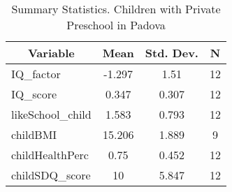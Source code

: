 
\begin{table}[htbp]\centering \caption{Summary Statistics. Children with Private Preschool in Padova \label{bothChildmaternaPrivPadova}}
\begin{tabular}{l c c  c}\hline\hline
\multicolumn{1}{c}{\textbf{Variable}} & \textbf{Mean}
 & \textbf{Std. Dev.} & \textbf{N}\\ \hline
IQ\_factor & -1.297 & 1.51  & 12\\
IQ\_score & 0.347 & 0.307  & 12\\
likeSchool\_child & 1.583 & 0.793  & 12\\
childBMI & 15.206 & 1.889  & 9\\
childHealthPerc & 0.75 & 0.452  & 12\\
childSDQ\_score & 10 & 5.847  & 12\\
\hline\end{tabular}
\end{table}
